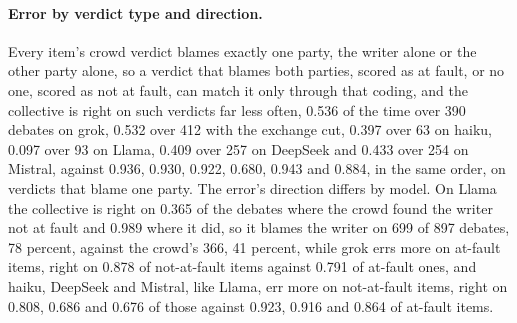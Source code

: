 \paragraph{Error by verdict type and direction.}
Every item's crowd verdict blames exactly one party, the writer alone or the
other party alone, so a verdict that blames both parties, scored as at fault,
or no one, scored as not at fault, can match it only through that coding, and
the collective is right on such verdicts far less often, 0.536 of the time
over 390 debates on grok, 0.532 over 412 with the exchange cut, 0.397 over 63
on haiku, 0.097 over 93 on Llama, 0.409 over 257 on DeepSeek and 0.433 over
254 on Mistral, against
0.936, 0.930, 0.922, 0.680, 0.943 and 0.884, in the same order, on verdicts
that blame one party.
The error's direction differs by model. On Llama the collective is right on
0.365 of the debates where the crowd found the writer not at fault and 0.989
where it did, so it blames the writer on 699 of 897 debates, 78 percent,
against the crowd's 366, 41 percent, while grok errs more on at-fault items,
right on 0.878 of not-at-fault items against 0.791 of at-fault ones, and
haiku, DeepSeek and Mistral, like Llama, err more on not-at-fault items,
right on 0.808, 0.686 and 0.676 of those against 0.923, 0.916 and 0.864 of
at-fault items.

